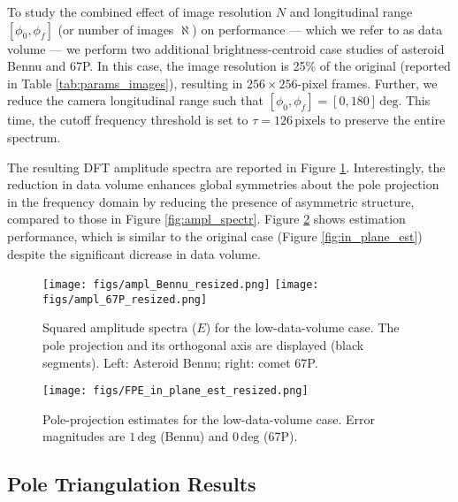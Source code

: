 To study the combined effect of image resolution $N$ and longitudinal range $[\phi_0,\phi_f]$ (or number of images $\aleph$) on performance --- which we refer to as data volume --- we perform two additional brightness-centroid case studies of asteroid Bennu and 67P. In this case, the image resolution is 25\% of the original (reported in Table \ref{tab:params_images}), resulting in $256\times 256$-pixel frames. Further, we reduce the camera longitudinal range such that $[\phi_0,\phi_f]=[0,180]\,\mathrm{deg}$. This time, the cutoff frequency threshold is set to $\tau=126\,\mathrm{pixels}$ to preserve the entire spectrum.

The resulting DFT amplitude spectra are reported in Figure \ref{fig:ampl_resized}. Interestingly, the reduction in data volume enhances global symmetries about the pole projection in the frequency domain by reducing the presence of asymmetric structure, compared to those in Figure \ref{fig:ampl_spectr}. Figure \ref{fig:in_plane_est_resized} shows estimation performance, which is similar to the original case (Figure \ref{fig:in_plane_est}) despite the significant dicrease in data volume.

\begin{figure}
    \texttt{[image: figs/ampl\_Bennu\_resized.png]}
    \texttt{[image: figs/ampl\_67P\_resized.png]}
    \caption{Squared amplitude spectra ($E$) for the low-data-volume case. The pole projection and its orthogonal axis are displayed (black segments). Left: Asteroid Bennu; right: comet 67P.}
    \label{fig:ampl_resized}
\end{figure}

\begin{figure}
    \centering
    \texttt{[image: figs/FPE\_in\_plane\_est\_resized.png]}
    \caption{Pole-projection estimates for the low-data-volume case. Error magnitudes are $1\,\mathrm{deg}$ (Bennu) and $0\,\mathrm{deg}$ (67P).}
    \label{fig:in_plane_est_resized}
\end{figure}

\subsection{Pole Triangulation Results}
\label{sec:out_of_plane_est}

